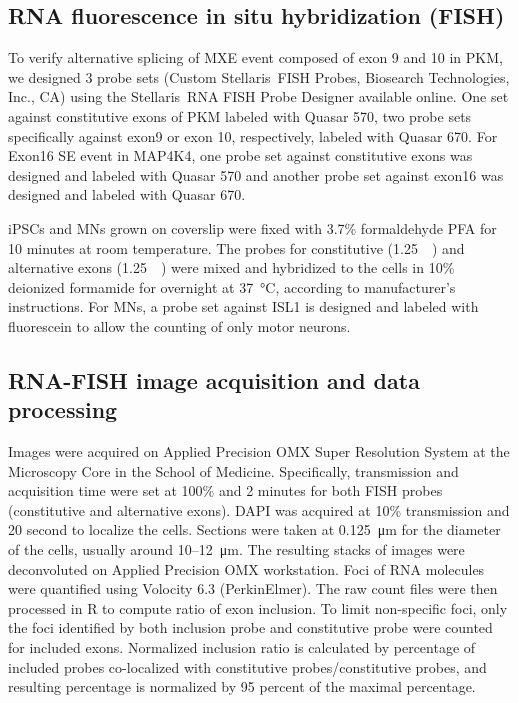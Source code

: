 \subsection{RNA fluorescence in situ hybridization (FISH)}

To verify alternative splicing of MXE event composed of exon 9 and 10 in PKM, we designed 3 probe sets (Custom Stellaris\textregistered\, FISH Probes, Biosearch Technologies, Inc., CA) using the Stellaris\textregistered\, RNA FISH Probe Designer available online. One set against constitutive exons of PKM labeled with Quasar 570, two probe sets specifically against exon9 or exon 10, respectively, labeled with Quasar 670. For Exon16 SE event in MAP4K4, one probe set against constitutive exons was designed and labeled with Quasar 570 and another probe set against exon16 was designed and labeled with Quasar 670.

iPSCs and MNs grown on coverslip were fixed with 3.7\% formaldehyde PFA for 10 minutes at room temperature. The probes for constitutive (\SI{1.25}{\micro\Molar}) and alternative exons (\SI{1.25}{\micro\Molar}) were mixed and hybridized to the cells in 10\% deionized formamide for overnight at \SI{37}{\degreeCelsius}, according to manufacturer's instructions. For MNs, a probe set against ISL1 is designed and labeled with fluorescein to allow the counting of only motor neurons.

\subsection{RNA-FISH image acquisition and data processing}

Images were acquired on Applied Precision OMX Super Resolution System at the Microscopy Core in the School of Medicine. Specifically, transmission and acquisition time were set at 100\% and 2 minutes for both FISH probes (constitutive and alternative exons). DAPI was acquired at 10\% transmission and 20 second to localize the cells. Sections were taken at \SI{0.125}{\micro\meter} for the diameter of the cells, usually around \numrange[range-phrase = --]{10}{12}\SI{}{\micro\meter}. The resulting stacks of images were deconvoluted on Applied Precision OMX workstation. Foci of RNA molecules were quantified using Volocity 6.3 (PerkinElmer). The raw count files were then processed in R to compute ratio of exon inclusion. To limit non-specific foci, only the foci identified by both inclusion probe and constitutive probe were counted for included exons. Normalized inclusion ratio is calculated by percentage of included probes co-localized with constitutive probes/constitutive probes, and resulting percentage is normalized by 95 percent of the maximal percentage.


